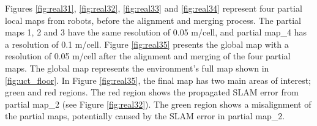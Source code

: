 Figures \ref{fig:real31}, \ref{fig:real32}, \ref{fig:real33} and \ref{fig:real34} represent four partial local maps from robots, before the alignment and merging process. The partial maps 1, 2 and 3 have the same resolution of 0.05 m/cell, and partial map\_4 has a resolution of 0.1 m/cell. Figure \ref{fig:real35} presents the global map with a resolution of 0.05 m/cell after the alignment and merging of the four partial maps. The global map represents the environment's full map shown in \ref{fig:uct_floor}. In Figure \ref{fig:real35}, the final map has two main areas of interest; green and red regions. The red region shows the propagated SLAM error from partial map\_2 (see Figure \ref{fig:real32}). The green region shows a misalignment of the partial maps, potentially caused by the SLAM error in partial map\_2.


